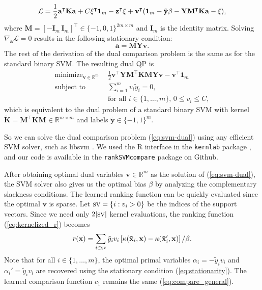 \documentclass{article}
\newcommand{\sv}{\textsc{sv}}
\newcommand{\RR}{\mathbb R}
\DeclareMathOperator*{\minimize}{minimize}
\begin{document}
\begin{equation}
  \label{eq:lagrangian}
  \mathcal L = \frac 1 2 \mathbf a^\intercal \mathbf K \mathbf a + 
  C\mathbf \xi^\intercal\mathbf  1_{m}\\
  -\mathbf z^\intercal \mathbf \xi
  + \mathbf v^\intercal(\mathbf 1_m - \mathbf{\tilde y}\beta
  - \mathbf Y \mathbf M^\intercal \mathbf K\mathbf  a - \xi),
\end{equation}
where $\mathbf M=[-\mathbf I_m \, \mathbf
I_m]^\intercal\in\{-1,0,1\}^{2m\times m}$ and $\mathbf I_m$ is the
identity matrix. Solving $\nabla_{\mathbf a} \mathcal L=0$ results in
the following stationary condition:
\begin{equation}
  \label{eq:stationarity}
  \mathbf a = \mathbf M \mathbf Y \mathbf v.
\end{equation}
The rest of the derivation of the dual comparison problem is the same
as for the standard binary SVM. The resulting dual QP is
\begin{equation}
  \begin{aligned}
    \label{eq:svm-dual}
    \minimize_{\mathbf v\in\RR^m}\ \ &
    \frac 1 2 \mathbf v^\intercal \mathbf Y \mathbf M^\intercal 
    \mathbf K \mathbf M \mathbf Y \mathbf v - \mathbf v^\intercal \mathbf 1_m\\
    \text{subject to}\ \ &
    \sum_{i=1}^m v_i \tilde y_i = 0,\\
    & \text{for all $i\in\{1,\dots,m\}$, } 0\leq v_i\leq C,
  \end{aligned}
\end{equation}
which is equivalent to the dual problem of a standard binary SVM with
kernel $\mathbf{\tilde K} = \mathbf M^\intercal \mathbf K \mathbf
M\in\RR^{m\times m}$ and labels $\mathbf{\tilde y}\in\{-1,1\}^m$.

So we can solve the dual comparison problem (\ref{eq:svm-dual}) using
any efficient SVM solver, such as libsvm \citep{libsvm}. We used the R
interface in the \texttt{kernlab} package \citep{kernlab}, and our
code is available in the \texttt{rankSVMcompare} package on Github.

After obtaining optimal dual variables $\mathbf v\in\RR^m$ as the solution of
(\ref{eq:svm-dual}), the SVM solver also gives us the optimal bias
$\beta$ by analyzing the complementary slackness conditions.
The learned ranking function can be quickly evaluated since the
optimal $\mathbf v$ is sparse. Let $\sv =\{i: v_i > 0\}$ be the indices
of the support vectors. Since we need only $2|\sv |$ kernel
evaluations, the ranking function (\ref{eq:kernelized_r}) becomes
\begin{equation}
  \label{eq:r_sv}
  r(\mathbf x)= 
  \sum_{i\in \sv }
  \tilde y_i v_i\left[ 
    \kappa(\mathbf{\tilde x}_i, \mathbf x)
    - \kappa(\mathbf{\tilde x}_i', \mathbf x)
  \right]/\beta.
\end{equation}
Note that for all $i\in\{1,\dots,m\}$, the optimal primal variables
$\alpha_i=-\tilde y_i v_i$ and $\alpha_i'=\tilde y_i v_i$ are
recovered using the stationary condition (\ref{eq:stationarity}). The
learned comparison function $c_1$ remains the same (\ref{eq:compare_general}).
\end{document}
